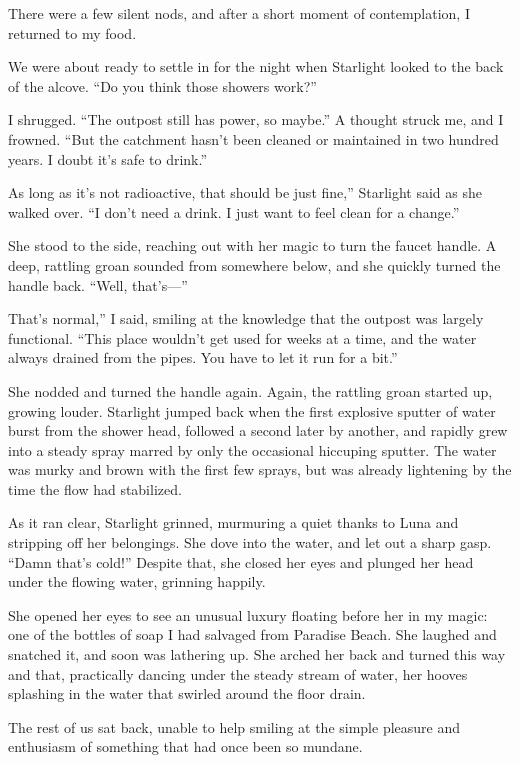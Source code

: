 There were a few silent nods, and after a short moment of contemplation, I returned to my food.

We were about ready to settle in for the night when Starlight looked to the back of the alcove. “Do you think those showers work?”

I shrugged. “The outpost still has power, so maybe.” A thought struck me, and I frowned. “But the catchment hasn’t been cleaned or maintained in two hundred years. I doubt it’s safe to drink.”

\leavevmode{}As long as it’s not radioactive, that should be just fine,” Starlight said as she walked over. “I don’t need a drink. I just want to feel clean for a change.”

She stood to the side, reaching out with her magic to turn the faucet handle. A deep, rattling groan sounded from somewhere below, and she quickly turned the handle back. “Well, that’s—”

\leavevmode{}That’s normal,” I said, smiling at the knowledge that the outpost was largely functional. “This place wouldn’t get used for weeks at a time, and the water always drained from the pipes. You have to let it run for a bit.”

She nodded and turned the handle again. Again, the rattling groan started up, growing louder. Starlight jumped back when the first explosive sputter of water burst from the shower head, followed a second later by another, and rapidly grew into a steady spray marred by only the occasional hiccuping sputter. The water was murky and brown with the first few sprays, but was already lightening by the time the flow had stabilized.

As it ran clear, Starlight grinned, murmuring a quiet thanks to Luna and stripping off her belongings. She dove into the water, and let out a sharp gasp. “Damn that’s cold!” Despite that, she closed her eyes and plunged her head under the flowing water, grinning happily.

She opened her eyes to see an unusual luxury floating before her in my magic: one of the bottles of soap I had salvaged from Paradise Beach. She laughed and snatched it, and soon was lathering up. She arched her back and turned this way and that, practically dancing under the steady stream of water, her hooves splashing in the water that swirled around the floor drain.

The rest of us sat back, unable to help smiling at the simple pleasure and enthusiasm of something that had once been so mundane.


